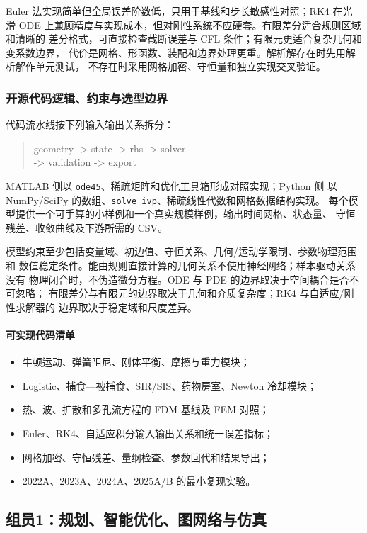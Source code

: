 \documentclass[UTF8,a4paper,12pt]{ctexart}
\begin{document}
Euler 法实现简单但全局误差阶数低，只用于基线和步长敏感性对照；RK4 在光滑 ODE
上兼顾精度与实现成本，但对刚性系统不应硬套。有限差分适合规则区域和清晰的
差分格式，可直接检查截断误差与 CFL 条件；有限元更适合复杂几何和变系数边界，
代价是网格、形函数、装配和边界处理更重。解析解存在时先用解析解作单元测试，
不存在时采用网格加密、守恒量和独立实现交叉验证。

\subsubsection{开源代码逻辑、约束与选型边界}

代码流水线按下列输入输出关系拆分：
\begin{quote}
\small\ttfamily
geometry -> state -> rhs -> solver\\
-> validation -> export
\end{quote}
MATLAB 侧以 \texttt{ode45}、稀疏矩阵和优化工具箱形成对照实现；Python 侧
以 NumPy/SciPy 的数组、\texttt{solve\_ivp}、稀疏线性代数和网格数据结构实现。
每个模型提供一个可手算的小样例和一个真实规模样例，输出时间网格、状态量、
守恒残差、收敛曲线及下游所需的 CSV。

模型约束至少包括变量域、初边值、守恒关系、几何/运动学限制、参数物理范围和
数值稳定条件。能由规则直接计算的几何关系不使用神经网络；样本驱动关系没有
物理闭合时，不伪造微分方程。ODE 与 PDE 的边界取决于空间耦合是否不可忽略；
有限差分与有限元的边界取决于几何和介质复杂度；RK4 与自适应/刚性求解器的
边界取决于稳定域和尺度差异。

\paragraph{可实现代码清单}
\begin{itemize}
  \item 牛顿运动、弹簧阻尼、刚体平衡、摩擦与重力模块；
  \item Logistic、捕食—被捕食、SIR/SIS、药物房室、Newton 冷却模块；
  \item 热、波、扩散和多孔流方程的 FDM 基线及 FEM 对照；
  \item Euler、RK4、自适应积分输入输出关系和统一误差指标；
  \item 网格加密、守恒残差、量纲检查、参数回代和结果导出；
  \item 2022A、2023A、2024A、2025A/B 的最小复现实验。
\end{itemize}

\subsection{组员1：规划、智能优化、图网络与仿真}
\end{document}
